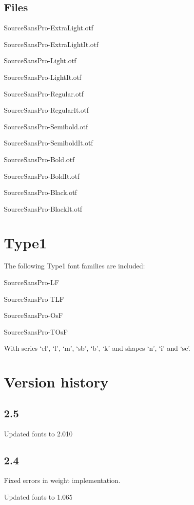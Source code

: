 \documentclass[11pt,a4paper,english]{article}
\begin{document}
\begin{multicols}{2}
\subsection{Files}
\begin{itemize*}
	\item SourceSansPro-ExtraLight.otf
	\item SourceSansPro-ExtraLightIt.otf
	\item SourceSansPro-Light.otf
	\item SourceSansPro-LightIt.otf
	\item SourceSansPro-Regular.otf
	\item SourceSansPro-RegularIt.otf
	\item SourceSansPro-Semibold.otf
	\item SourceSansPro-SemiboldIt.otf
	\item SourceSansPro-Bold.otf
	\item SourceSansPro-BoldIt.otf
	\item SourceSansPro-Black.otf
	\item SourceSansPro-BlackIt.otf
\end{itemize*}

\section{Type1}
The following Type1 font families are included:
\begin{itemize*}
	\item SourceSansPro-LF
	\item SourceSansPro-TLF
	\item SourceSansPro-OsF
	\item SourceSansPro-TOsF
\end{itemize*}
With series ‘el’, ‘l’, ‘m’, ‘sb’, ‘b’, ‘k’ and shapes ‘n’, ‘i’ and ‘sc’.

\section{Version history}
\subsection*{2.5}
\begin{itemize*}
	\item Updated fonts to 2.010
\end{itemize*}

\subsection*{2.4}
\begin{itemize*}
	\item Fixed errors in weight implementation.
	\item Updated fonts to 1.065
\end{itemize*}


\end{multicols}
\end{document}
